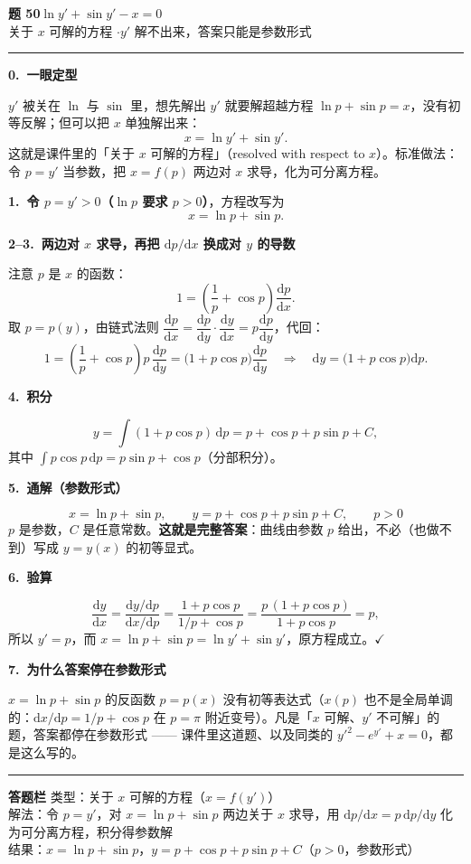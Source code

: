 \documentclass[11pt,a4paper]{ctexart}
\newcommand{\dd}{\mathrm{d}}
\begin{document}
\setlength{\abovedisplayskip}{4pt}
\setlength{\belowdisplayskip}{4pt}
\setlength{\abovedisplayshortskip}{2pt}
\setlength{\belowdisplayshortskip}{2pt}

{\color{mainblue}\Large\bfseries 题 50\quad $\ln y'+\sin y'-x=0$}\\[1pt]
{\color{mainblue}\small 关于 $x$ 可解的方程 \quad$\cdot$\quad $y'$ 解不出来，答案只能是参数形式}

\vspace{0.2em}
\noindent\rule{\linewidth}{0.6pt}

\textbf{0.\ 一眼定型}

$y'$ 被关在 $\ln$ 与 $\sin$ 里，想先解出 $y'$ 就要解超越方程 $\ln p+\sin p=x$，没有初等反解；但可以把 $x$ 单独解出来：
\[
x=\ln y'+\sin y' .
\]
这就是课件里的「关于 $x$ 可解的方程」（resolved with respect to $x$）。标准做法：令 $p=y'$ 当参数，把 $x=f(p)$ 两边对 $x$ 求导，化为可分离方程。

\textbf{1.\ 令 $p=y'>0$（$\ln p$ 要求 $p>0$）}，方程改写为
\[
x=\ln p+\sin p .
\tag{$\ast$}
\]

\textbf{2--3.\ 两边对 $x$ 求导，再把 $\dd p/\dd x$ 换成对 $y$ 的导数}

注意 $p$ 是 $x$ 的函数：
\[
1=\left(\frac{1}{p}+\cos p\right)\frac{\dd p}{\dd x}.
\]
取 $p=p(y)$，由链式法则 $\dfrac{\dd p}{\dd x}=\dfrac{\dd p}{\dd y}\cdot\dfrac{\dd y}{\dd x}=p\dfrac{\dd p}{\dd y}$，代回：
\[
1=\left(\frac{1}{p}+\cos p\right)p\,\frac{\dd p}{\dd y}
=\bigl(1+p\cos p\bigr)\frac{\dd p}{\dd y}
\quad\Longrightarrow\quad
\dd y=\bigl(1+p\cos p\bigr)\dd p .
\]

\textbf{4.\ 积分}

\[
y=\int(1+p\cos p)\,\dd p=p+\cos p+p\sin p+C,
\]
其中 $\int p\cos p\,\dd p=p\sin p+\cos p$（分部积分）。

\textbf{5.\ 通解（参数形式）}

\[
\boxed{\;x=\ln p+\sin p,\qquad y=p+\cos p+p\sin p+C,\qquad p>0\;}
\]
$p$ 是参数，$C$ 是任意常数。\textbf{这就是完整答案}：曲线由参数 $p$ 给出，不必（也做不到）写成 $y=y(x)$ 的初等显式。

\textbf{6.\ 验算}

\[
\frac{\dd y}{\dd x}=\frac{\dd y/\dd p}{\dd x/\dd p}
=\frac{1+p\cos p}{1/p+\cos p}
=\frac{p\,(1+p\cos p)}{1+p\cos p}=p,
\]
所以 $y'=p$，而 $x=\ln p+\sin p=\ln y'+\sin y'$，原方程成立。\hfill$\checkmark$

\textbf{7.\ 为什么答案停在参数形式}

$x=\ln p+\sin p$ 的反函数 $p=p(x)$ 没有初等表达式（$x(p)$ 也不是全局单调的：$\dd x/\dd p=1/p+\cos p$ 在 $p=\pi$ 附近变号）。凡是「$x$ 可解、$y'$ 不可解」的题，答案都停在参数形式 —— 课件里这道题、以及同类的 $y'^2-e^{y'}+x=0$，都是这么写的。

\vspace{0.1em}
\noindent\rule{\linewidth}{0.6pt}

{\small
\textbf{答题栏}\quad
类型：关于 $x$ 可解的方程（$x=f(y')$）\\
解法：令 $p=y'$，对 $x=\ln p+\sin p$ 两边关于 $x$ 求导，用 $\dd p/\dd x=p\,\dd p/\dd y$ 化为可分离方程，积分得参数解\\
结果：$x=\ln p+\sin p$，$y=p+\cos p+p\sin p+C$（$p>0$，参数形式）}
\end{document}
